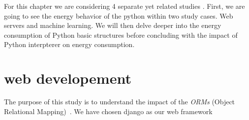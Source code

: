 For this chapter we are considering 4 separate yet related studies .
First, we are going to see the energy behavior of the python within two study cases. Web servers and machine learning. We will then delve deeper into the energy consumption of Python basic structures before concluding with the impact of Python interpterer on energy consumption.













\section{web developement}
The purpose of this study is to understand the impact of the \emph{ORMs} (Object Relational Mapping)~\cite{o2008object}. We have chosen django as our web framework

